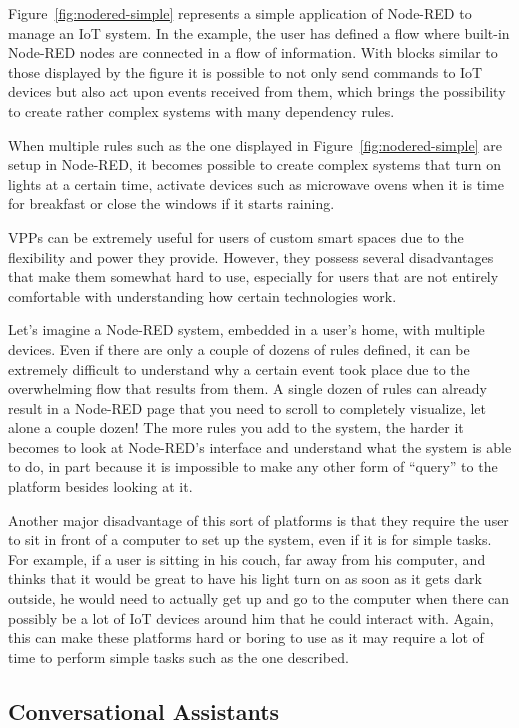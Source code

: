 \documentclass[runningheads]{llncs}
\begin{document}
Figure~\ref{fig:nodered-simple} represents a simple application of Node-RED to manage an IoT system. In the example, the user has defined a flow where built-in Node-RED nodes are connected in a flow of information. With blocks similar to those displayed by the figure it is possible to not only send commands to IoT devices but also act upon events received from them, which brings the possibility to create rather complex systems with many dependency rules.

When multiple rules such as the one displayed in Figure~\ref{fig:nodered-simple} are setup in Node-RED, it becomes possible to create complex systems that turn on lights at a certain time, activate devices such as microwave ovens when it is time for breakfast or close the windows if it starts raining.

VPPs can be extremely useful for users of custom smart spaces due to the flexibility and power they provide. However, they possess several disadvantages that make them somewhat hard to use, especially for users that are not entirely comfortable with understanding how certain technologies work.

Let's imagine a Node-RED system, embedded in a user’s home, with multiple devices. Even if there are only a couple of dozens of rules defined, it can be extremely difficult to understand why a certain event took place due to the overwhelming flow that results from them. A single dozen of rules can already result in a Node-RED page that you need to scroll to completely visualize, let alone a couple dozen! The more rules you add to the system, the harder it becomes to look at Node-RED’s interface and understand what the system is able to do, in part because it is impossible to make any other form of  “query” to the platform besides looking at it.

Another major disadvantage of this sort of platforms is that they require the user to sit in front of a computer to set up the system, even if it is for simple tasks. For example, if a user is sitting in his couch, far away from his computer, and thinks that it would be great to have his light turn on as soon as it gets dark outside, he would need to actually get up and go to the computer when there can possibly be a lot of IoT devices around him that he could interact with. Again, this can make these platforms hard or boring to use as it may require a lot of time to perform simple tasks such as the one described.

\subsection{Conversational Assistants}
\end{document}
